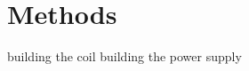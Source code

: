 \setchapterpreamble[u]{\margintoc\hfil}
\chapter{Methods}

building the coil
building the power supply